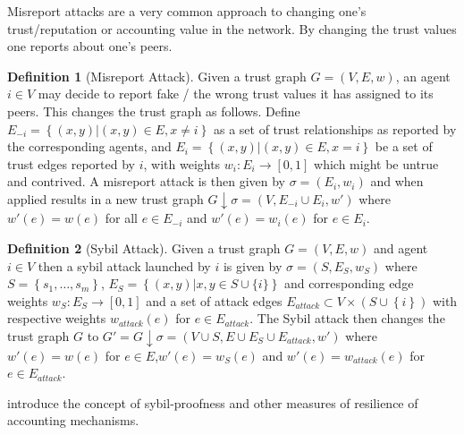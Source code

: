 \documentclass[11pt,a4paper]{report}
\theoremstyle{definition}
\newtheorem{definition}{Definition}[section]
\theoremstyle{theorem}
\theoremstyle{proposition}
\theoremstyle{corollary}
\theoremstyle{lemma}
\theoremstyle{example}
\theoremstyle{remark}
\begin{document}
\noindent{}Misreport attacks are a very common approach to changing one's trust/reputation or accounting value in the network. By changing the trust values one reports about one's peers.  
\begin{definition}[Misreport Attack]
Given a trust graph $G=(V,E,w)$, an agent $i\in{}V$ may decide to report fake / the wrong trust values it has assigned to its peers. This changes the trust graph as follows. Define $E_{-i}=\left\lbrace{}(x,y)|(x,y)\in{}E, x\neq{}i\right\rbrace$ as a set of trust relationships as reported by the corresponding agents, and $E_i=\left\lbrace{}(x,y)|(x,y)\in{}E,x=i\right\rbrace$ be a set of trust edges reported by $i$, with weights $w_i:E_i\rightarrow{}[0,1]$ which might be untrue and contrived. A misreport attack is then given by $\sigma=(E_i,w_i)$ and when applied results in a new trust graph $G\downarrow\sigma=(V,E_{-i}\cup{}E_{i},w')$ where $w'(e)=w(e)$ for all $e\in{}E_{-i}$ and $w'(e)=w_i(e)$ for $e\in{}E_{i}$. \vspace{1em}\\
\end{definition}

\begin{definition}[Sybil Attack]
Given a trust graph $G=(V,E,w)$ and agent $i\in{}V$ then a sybil attack launched by $i$ is given by $\sigma=(S,E_S,w_S)$ where $S=\left\lbrace{}s_1,\ldots,s_m\right\rbrace$, $E_S=\left\lbrace{}(x,y)|x,y\in{}S\cup\{i\}\right\rbrace$ and corresponding edge weights $w_S:E_S\rightarrow{}[0,1]$ and a set of attack edges $E_{attack}\subset{}V\times{}(S\cup{}\left\lbrace{}i\right\rbrace)$ with respective weights $w_{attack}(e)$ for $e\in{}E_{attack}$. The Sybil attack then changes the trust graph $G$ to $G' = G\downarrow\sigma = (V\cup{}S,E\cup{}E_S\cup{}E_{attack},w')$ where $w'(e)=w(e)$ for $e\in{}E$,$w'(e)=w_S(e)$ and $w'(e)=w_{attack}(e)$ for $e\in{}E_{attack}$.
\end{definition}
\noindent{}\cite{Work Accounting Mechanisms: Theory and Practice} introduce the concept of sybil-proofness and other measures of resilience of accounting mechanisms. \vspace{1em}\\
\end{document}
